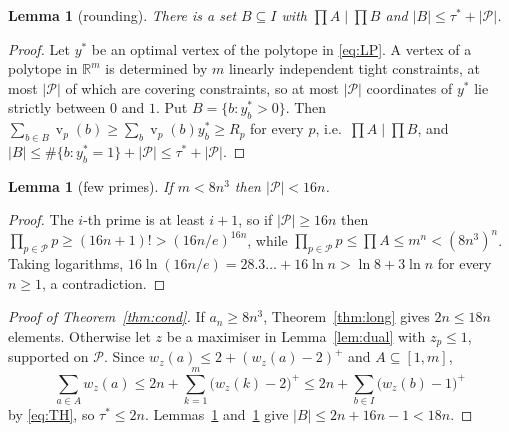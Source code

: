 \documentclass[11pt]{article}
\newtheorem{lemma}[theorem]{Lemma}
\theoremstyle{definition}
\DeclareMathOperator{\vp}{v}
\begin{document}
\begin{lemma}[rounding]\label{lem:round}
There is a set $B\subseteq I$ with $\prod A\mid\prod B$ and $|B|\le\tau^*+|\mathcal P|$.
\end{lemma}
\begin{proof}
Let $y^*$ be an optimal vertex of the polytope in \eqref{eq:LP}. A vertex of a polytope in $\mathbb R^{m}$ is
determined by $m$ linearly independent tight constraints, at most $|\mathcal P|$ of which are covering constraints,
so at most $|\mathcal P|$ coordinates of $y^*$ lie strictly between $0$ and $1$. Put $B=\{b:y^*_b>0\}$. Then
$\sum_{b\in B}\vp_p(b)\ge\sum_b\vp_p(b)y^*_b\ge R_p$ for every $p$, i.e.\ $\prod A\mid\prod B$, and
$|B|\le\#\{b:y^*_b=1\}+|\mathcal P|\le\tau^*+|\mathcal P|$.
\end{proof}

\begin{lemma}[few primes]\label{lem:fewprimes}
If $m<8n^3$ then $|\mathcal P|<16n$.
\end{lemma}
\begin{proof}
The $i$-th prime is at least $i+1$, so if $|\mathcal P|\ge16n$ then
$\prod_{p\in\mathcal P}p\ge(16n+1)!>(16n/e)^{16n}$, while $\prod_{p\in\mathcal P}p\le\prod A\le m^n<(8n^3)^n$.
Taking logarithms, $16\ln(16n/e)=28.3\ldots+16\ln n>\ln 8+3\ln n$ for every $n\ge1$, a contradiction.
\end{proof}

\begin{proof}[Proof of Theorem~\ref{thm:cond}]
If $a_n\ge8n^3$, Theorem~\ref{thm:long} gives $2n\le18n$ elements. Otherwise let $z$ be a maximiser in
Lemma~\ref{lem:dual} with $z_p\le1$, supported on $\mathcal P$. Since $w_z(a)\le2+(w_z(a)-2)^+$ and $A\subseteq[1,m]$,
\[
\sum_{a\in A}w_z(a)\le 2n+\sum_{k=1}^{m}\bigl(w_z(k)-2\bigr)^+\le 2n+\sum_{b\in I}\bigl(w_z(b)-1\bigr)^+
\]
by \eqref{eq:TH}, so $\tau^*\le2n$. Lemmas~\ref{lem:round} and~\ref{lem:fewprimes} give $|B|\le 2n+16n-1<18n$.
\end{proof}
\end{document}
